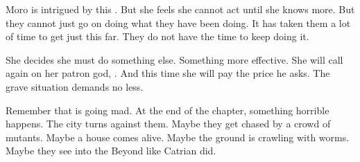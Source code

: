 Moro is intrigued by this .
But she feels she cannot act until she knows more. 
But they cannot just go on doing what they have been doing. 
It has taken them a lot of time to get just this far.
They do not have the time to keep doing it.

She decides she must do something else.
Something more effective.
She will call again on her patron god, \Nasshikerr. 
And this time she will pay the price he asks.
The grave situation demands no less. 

Remember that \Malcur is going mad. 
At the end of the chapter, something horrible happens.
The city turns against them.
Maybe they get chased by a crowd of mutants. 
Maybe a house comes alive. 
Maybe the ground is crawling with worms.
Maybe they see into the Beyond like Catrian did. 








